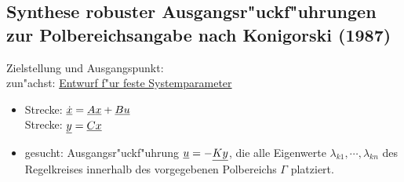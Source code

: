 \documentclass[openany,a4paper,11pt]{book}
\begin{document}
\subsection{Synthese robuster Ausgangsr"uckf"uhrungen zur Polbereichsangabe nach Konigorski (1987)}
Zielstellung und Ausgangspunkt: \\
zun"achst: \uline{Entwurf f"ur feste Systemparameter}\begin{itemize}
    \item Strecke: $\uline{\dot{x}}=\uline{A}\uline{x}+\uline{B}\uline{u}$\\ {\color{white}Strecke: }$\uline{y}=\uline{Cx}$
    \item gesucht: Ausgangsr"uckf"uhrung $\uline{u}=-\uline{Ky}$, die alle Eigenwerte $\lambda_{k1},\cdots,\lambda_{kn}$ des Regelkreises innerhalb des vorgegebenen Polbereichs $\Gamma$ platziert.
\end{itemize}
\end{document}
